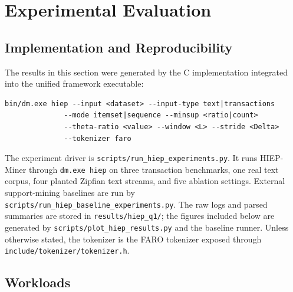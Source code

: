 \documentclass[11pt,a4paper]{article}
\begin{document}
\section{Experimental Evaluation}

\subsection{Implementation and Reproducibility}

The results in this section were generated by the C implementation integrated into the unified framework executable:

\begin{verbatim}
bin/dm.exe hiep --input <dataset> --input-type text|transactions
              --mode itemset|sequence --minsup <ratio|count>
              --theta-ratio <value> --window <L> --stride <Delta>
              --tokenizer faro
\end{verbatim}

The experiment driver is \texttt{scripts/run\_hiep\_experiments.py}. It runs HIEP-Miner through \texttt{dm.exe hiep} on three transaction benchmarks, one real text corpus, four planted Zipfian text streams, and five ablation settings. External support-mining baselines are run by \texttt{scripts/run\_hiep\_baseline\_experiments.py}. The raw logs and parsed summaries are stored in \texttt{results/hiep\_q1/}; the figures included below are generated by \texttt{scripts/plot\_hiep\_results.py} and the baseline runner. Unless otherwise stated, the tokenizer is the FARO tokenizer exposed through \texttt{include/tokenizer/tokenizer.h}.

\subsection{Workloads}
\end{document}
